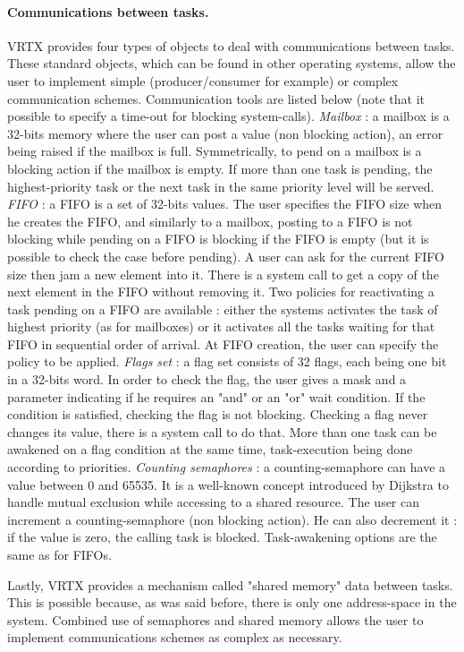 \documentclass[10pt]{report}
\begin{document}
\paragraph{Communications between tasks.} VRTX provides four types of objects to deal with communications
between tasks. These standard objects, which can be found in other
operating systems, allow the user to implement simple
(producer/consumer for example) or complex communication schemes.
Communication tools are listed below (note that it possible to
specify a time-out for blocking system-calls). {\em Mailbox} : a
mailbox is a 32-bits memory where the user can post a value (non
blocking action), an error being raised if the mailbox is full.
Symmetrically, to pend on a mailbox is a blocking action if the
mailbox is empty. If more than one task is pending, the
highest-priority task or the next task in the same priority level
will be served. {\em FIFO} :
a FIFO is a set of 32-bits values. The
user specifies the FIFO size when he creates the FIFO, and
similarly to a mailbox, posting to a FIFO is not blocking while
pending on a FIFO is blocking if the FIFO is empty (but it is possible
to check the case before pending). A user can ask for the current
FIFO size then jam a new element into it. There is a system call
to get a copy of the next element in the FIFO without removing
it. Two policies for reactivating a task pending on a FIFO are
available : either the systems activates the task of highest
priority (as for mailboxes) or it activates all the tasks waiting
for that FIFO in sequential order of arrival. At FIFO creation,
the user can specify the policy to be applied. {\em Flags set} : a
flag set consists of 32 flags, each being one bit in a 32-bits word. In
order to check the flag, the user gives a mask and a parameter
indicating if he requires an "and" or an "or" wait condition. If the
condition is satisfied, checking the flag is not blocking.
Checking a flag never changes its value, there is a system call
to do that. More than one task can be awakened on a flag condition
at the same time, task-execution being done according to
priorities. {\em Counting semaphores} : a counting-semaphore can have
a value between 0 and 65535. It is a well-known concept
introduced by Dijkstra to handle mutual exclusion while accessing
to a shared resource. The user can increment a counting-semaphore
(non blocking action). He can also decrement it : if the value is
zero, the calling task is blocked. Task-awakening options are the
same as for FIFOs.

Lastly, VRTX provides a mechanism called "shared memory"
data between tasks. This is possible because, as was said before,
there is only one address-space in the system. Combined use of
semaphores and shared memory allows the user to implement
communications schemes as complex as necessary.
\end{document}
